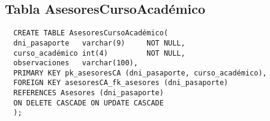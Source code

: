 \subsection{Tabla AsesoresCursoAcadémico}

\begin{verbatim}
  CREATE TABLE AsesoresCursoAcadémico(
  dni_pasaporte   varchar(9)     NOT NULL,
  curso_académico int(4)         NOT NULL,
  observaciones   varchar(100),
  PRIMARY KEY pk_asesoresCA (dni_pasaporte, curso_académico),
  FOREIGN KEY asesoresCA_fk_asesores (dni_pasaporte)
  REFERENCES Asesores (dni_pasaporte)
  ON DELETE CASCADE ON UPDATE CASCADE
  );
\end{verbatim}